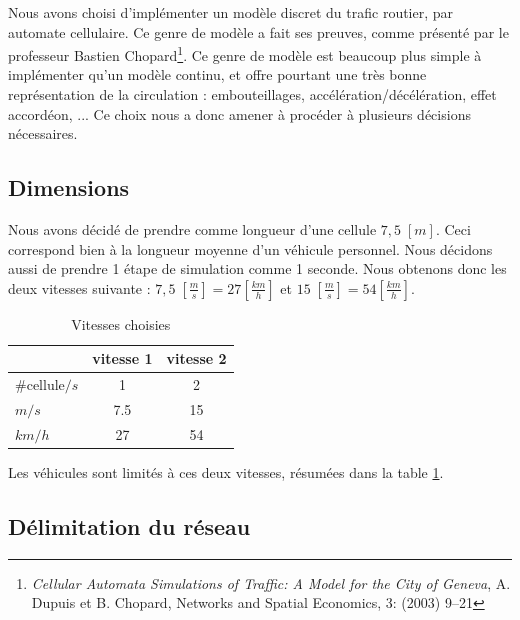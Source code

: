 \documentclass[a4paper,11pt, titlepage]{extarticle}
\begin{document}
Nous avons choisi d'implémenter un modèle discret du trafic routier, par automate cellulaire. Ce genre de modèle a fait ses preuves, comme présenté par le professeur Bastien Chopard\footnote{\emph{Cellular Automata Simulations of Traffic:
A Model for the City of Geneva}, A. Dupuis et B. Chopard, Networks and Spatial Economics, 3: (2003) 9–21}. Ce genre de modèle est beaucoup plus simple à implémenter qu'un modèle continu, et offre pourtant une très bonne représentation de la circulation : embouteillages, accélération/décélération, effet accordéon, ... Ce choix nous a donc amener à procéder à plusieurs décisions nécessaires.

\subsection{Dimensions}

Nous avons décidé de prendre comme longueur d'une cellule $7,5 \; [m]$. Ceci correspond bien à la longueur moyenne d'un véhicule personnel. Nous décidons aussi de prendre 1 étape de simulation comme 1 seconde. Nous obtenons donc les deux vitesses suivante : $7,5 \; [\frac{m}{s}] = 27 [\frac{km}{h}]$ et $15 \; [\frac{m}{s}] = 54 [\frac{km}{h}]$.

\begin{table}[h!]
\begin{center}
\begin{tabular}{|l|c|c|}
\hline
 & vitesse 1 & vitesse 2 \\ \hline
\#cellule$/s$& 1 & 2 \\ \hline
$m/s$ & 7.5 & 15 \\ \hline\hline
$km/h$ & 27 & 54 \\ \hline
\end{tabular}
\end{center}
\caption{Vitesses choisies}
\label{tabSpeed}
\end{table}

Les véhicules sont limités à ces deux vitesses, résumées dans la table \ref{tabSpeed}.

\subsection{Délimitation du réseau}
\end{document}
